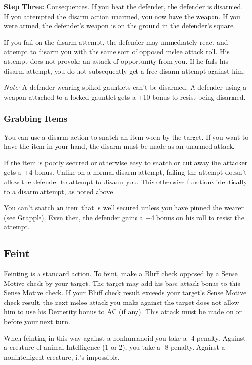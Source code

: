 \textbf{Step Three:} Consequences. If you beat the defender, the defender is disarmed. 
If you attempted the disarm action unarmed, you now have the weapon. If you were 
armed, the defender's weapon is on the ground in the defender's square.

If you fail on the disarm attempt, the defender may immediately react and attempt 
to disarm you with the same sort of opposed melee attack roll. His attempt does 
not provoke an attack of opportunity from you. If he fails his disarm attempt, 
you do not subsequently get a free disarm attempt against him.

\textit{Note:} A defender wearing spiked gauntlets can't be disarmed. A defender 
using a weapon attached to a locked gauntlet gets a +10 bonus to resist being disarmed.

\subsubsection{Grabbing Items}

You can use a disarm action to snatch an item worn by the target. If you want to 
have the item in your hand, the disarm must be made as an unarmed attack.

If the item is poorly secured or otherwise easy to snatch or cut away the attacker 
gets a +4 bonus. Unlike on a normal disarm attempt, failing the attempt doesn't 
allow the defender to attempt to disarm you. This otherwise functions identically 
to a disarm attempt, as noted above.

You can't snatch an item that is well secured unless you have pinned the wearer 
(see Grapple). Even then, the defender gains a +4 bonus on his roll to resist the 
attempt.

\subsection{Feint}

Feinting is a standard action. To feint, make a Bluff check opposed by a Sense 
Motive check by your target. The target may add his base attack bonus to this Sense 
Motive check. If your Bluff check result exceeds your target's Sense Motive check 
result, the next melee attack you make against the target does not allow him to 
use his Dexterity bonus to AC (if any). This attack must be made on or before your 
next turn.

When feinting in this way against a nonhumanoid you take a -4 penalty. Against 
a creature of animal Intelligence (1 or 2), you take a -8 penalty. Against a nonintelligent 
creature, it's impossible.

